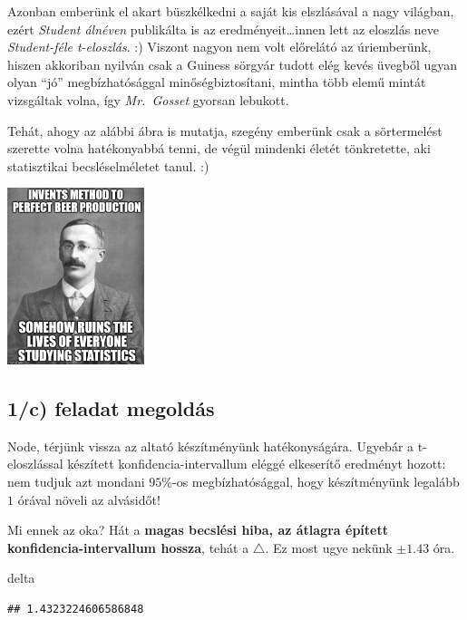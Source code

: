 \documentclass[
]{book}
\newenvironment{Shaded}{\begin{snugshade}}{\end{snugshade}}
\newcommand{\NormalTok}[1]{#1}
\begin{document}
Azonban emberünk el akart büszkélkedni a saját kis elszlásával a nagy világban, ezért \emph{Student álnéven} publikálta is az eredményeit\ldots innen lett az eloszlás neve \emph{Student-féle t-eloszlás}. :) Viszont nagyon nem volt előrelátó az úriemberünk, hiszen akkoriban nyilván csak a Guiness sörgyár tudott elég kevés üvegből ugyan olyan ``jó'' megbízhatósággal minőségbiztosítani, mintha több elemű mintát vizsgáltak volna, így \emph{Mr.~Gosset} gyorsan lebukott.

Tehát, ahogy az alábbi ábra is mutatja, szegény emberünk csak a sörtermelést szerette volna hatékonyabbá tenni, de végül mindenki életét tönkretette, aki statisztikai becsléselméletet tanul. :)

\includegraphics[width=0.3\textwidth,height=\textheight]{student.png}

\subsection*{1/c) feladat megoldás}\label{c-feladat-megolduxe1s}

Node, térjünk vissza az altató készítményünk hatékonyságára. Ugyebár a t-eloszlással készített konfidencia-intervallum eléggé elkeserítő eredményt hozott: nem tudjuk azt mondani \(95\%\)-os megbízhatósággal, hogy készítményünk legalább \(1\) órával növeli az alvásidőt!

Mi ennek az oka? Hát a \textbf{magas becslési hiba, az átlagra épített konfidencia-intervallum hossza}, tehát a \(\triangle\). Ez most ugye nekünk \(\pm 1.43\) óra.

\begin{Shaded}
\begin{Highlighting}[]
\NormalTok{delta}
\end{Highlighting}
\end{Shaded}

\begin{verbatim}
## 1.4323224606586848
\end{verbatim}
\end{document}
